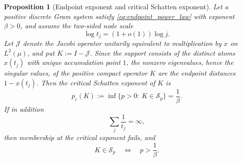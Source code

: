 \documentclass[preprint,12pt]{elsarticle}
\numberwithin{equation}{section}
\theoremstyle{plain}
\newtheorem{proposition}[theorem]{Proposition}
\theoremstyle{definition}
\theoremstyle{remark}
\begin{document}
\begin{proposition}[Endpoint exponent and critical Schatten exponent]
\label{prop:schatten_endpoint_exponent}
Let a positive discrete Gram system satisfy \eqref{eq:endpoint_power_law} with exponent $\beta>0$, and assume the two-sided node scale
\begin{equation}
\log t_j=(1+o(1))\log j.
\label{eq:two_sided_node_scale}
\end{equation}
Let $\mathcal J$ denote the Jacobi operator unitarily equivalent to multiplication by $x$ on $L^2(\mu)$, and put $K:=I-\mathcal J$. Since the support consists of the distinct atoms $x(t_j)$ with unique accumulation point $1$, the nonzero eigenvalues, hence the singular values, of the positive compact operator $K$ are the endpoint distances $1-x(t_j)$. Then the critical Schatten exponent of $K$ is
\begin{equation}
p_c(K):=\inf\{p>0:\ K\in\mathcal S_p\}=\frac1\beta.
\label{eq:critical_schatten_exponent}
\end{equation}
If in addition
\begin{equation}
\sum_j\frac1{t_j}=\infty,
\label{eq:endpoint_divergence_hypothesis}
\end{equation}
then membership at the critical exponent fails, and
\begin{equation}
K\in\mathcal S_p
\quad\Longleftrightarrow\quad
p>\frac1\beta.
\label{eq:schatten_threshold_general_beta}
\end{equation}
\end{proposition}
\end{document}
